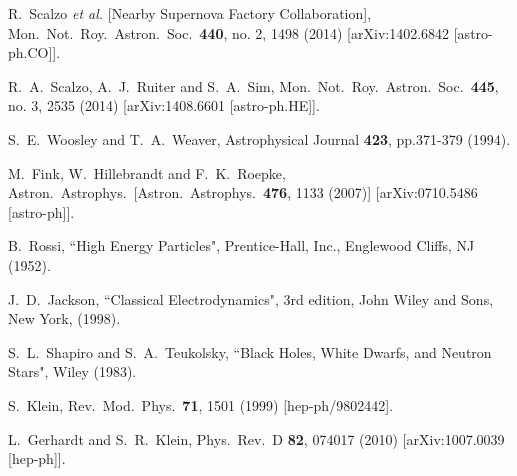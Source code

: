 \documentclass[twocolumn, preprintnumbers,amsmath,amssymb,prd, superscriptaddress]{revtex4}
\begin{document}
\begin{thebibliography}{99}
  R.~Scalzo {\it et al.} [Nearby Supernova Factory Collaboration],
  Mon.\ Not.\ Roy.\ Astron.\ Soc.\  {\bf 440}, no. 2, 1498 (2014)
  [arXiv:1402.6842 [astro-ph.CO]].


  R.~A.~Scalzo, A.~J.~Ruiter and S.~A.~Sim,
  Mon.\ Not.\ Roy.\ Astron.\ Soc.\  {\bf 445}, no. 3, 2535 (2014)
  [arXiv:1408.6601 [astro-ph.HE]].


  S.~E.~Woosley and T.~A.~Weaver, Astrophysical Journal {\bf 423}, pp.371-379 (1994).

  M.~Fink, W.~Hillebrandt and F.~K.~Roepke,
  Astron.\ Astrophys.\
  [Astron.\ Astrophys.\  {\bf 476}, 1133 (2007)]
  [arXiv:0710.5486 [astro-ph]].


B.~Rossi, ``High Energy Particles", Prentice-Hall, Inc., Englewood Cliffs, NJ (1952).

J.~D.~Jackson, ``Classical Electrodynamics", 3rd edition, John Wiley and Sons, New
York, (1998).

S.~L.~Shapiro and S.~A.~Teukolsky, ``Black Holes, White Dwarfs, and Neutron Stars", Wiley (1983).

  S.~Klein,
  Rev.\ Mod.\ Phys.\  {\bf 71}, 1501 (1999)
  [hep-ph/9802442].

  L.~Gerhardt and S.~R.~Klein,
  Phys.\ Rev.\ D {\bf 82}, 074017 (2010)
  [arXiv:1007.0039 [hep-ph]].


\end{thebibliography}
\end{document}
